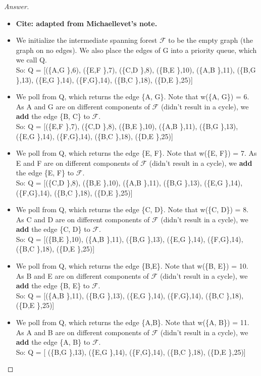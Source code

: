 \documentclass[11pt]{article}
\theoremstyle{definition}
\theoremstyle{definition}
\theoremstyle{definition}
\begin{document}
\begin{proof}[Answer]
\begin{itemize}
\item \textbf{Cite: adapted from Michaellevet's note.}
\item We initialize the intermediate spanning forest $\mathcal{F}$ to be the empty graph (the graph on no edges). We also
place the edges of G into a priority queue, which we call Q.\\ 
So: Q = [(\{A,G \},6), (\{E,F \},7), (\{C,D \},8), (\{B,E \},10), (\{A,B \},11), (\{B,G \},13), (\{E,G \},14), (\{F,G\},14), (\{B,C \},18), (\{D,E \},25)]

\item We poll from Q, which returns the edge \{A, G\}. Note that w(\{A, G\}) = 6. As A and G are on different
components of $\mathcal{F}$ (didn't result in a cycle), we \textbf{add} the edge \{B, C\} to $\mathcal{F}$.\\
So: Q = [(\{E,F \},7), (\{C,D \},8), (\{B,E \},10), (\{A,B \},11), (\{B,G \},13), (\{E,G \},14), (\{F,G\},14), (\{B,C \},18), (\{D,E \},25)]

\item We poll from Q, which returns the edge \{E, F\}. Note that w(\{E, F\}) = 7. As E and F are on different
components of $\mathcal{F}$ (didn't result in a cycle), we \textbf{add} the edge \{E, F\} to $\mathcal{F}$.\\
So: Q = [(\{C,D \},8), (\{B,E \},10), (\{A,B \},11), (\{B,G \},13), (\{E,G \},14), (\{F,G\},14), (\{B,C \},18), (\{D,E \},25)]

\item We poll from Q, which returns the edge \{C, D\}. Note that w(\{C, D\}) = 8. As C and D are on different
components of $\mathcal{F}$ (didn't result in a cycle), we \textbf{add} the edge \{C, D\} to $\mathcal{F}$.\\
So: Q = [(\{B,E \},10), (\{A,B \},11), (\{B,G \},13), (\{E,G \},14), (\{F,G\},14), (\{B,C \},18), (\{D,E \},25)]
 
\item We poll from Q, which returns the edge \{B,E\}. Note that w(\{B, E\}) = 10. As B and E are on different
components of $\mathcal{F}$ (didn't result in a cycle), we \textbf{add} the edge \{B, E\} to $\mathcal{F}$.\\
So: Q = [(\{A,B \},11), (\{B,G \},13), (\{E,G \},14), (\{F,G\},14), (\{B,C \},18), (\{D,E \},25)]

\item We poll from Q, which returns the edge \{A,B\}. Note that w(\{A, B\}) = 11. As A and B are on different
components of $\mathcal{F}$ (didn't result in a cycle), we \textbf{add} the edge \{A, B\} to $\mathcal{F}$.\\
So: Q = [ (\{B,G \},13), (\{E,G \},14), (\{F,G\},14), (\{B,C \},18), (\{D,E \},25)]


\end{itemize}
\end{proof}
\end{document}

